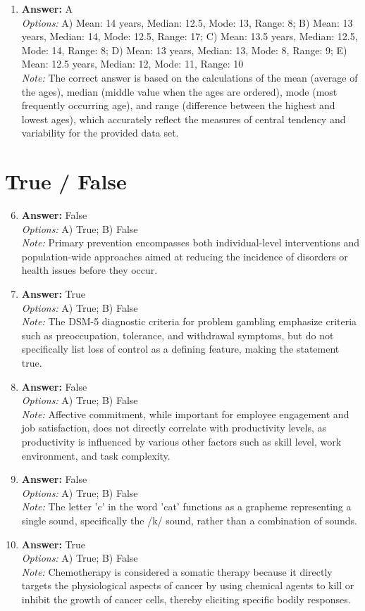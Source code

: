 \documentclass[12pt]{article}
\begin{document}
\begin{enumerate}[label=\arabic*.]
\item \textbf{Answer:} A
\\ \textit{Options:} A) Mean: 14 years, Median: 12.5, Mode: 13, Range: 8; B) Mean: 13 years, Median: 14, Mode: 12.5, Range: 17; C) Mean: 13.5 years, Median: 12.5, Mode: 14, Range: 8; D) Mean: 13 years, Median: 13, Mode: 8, Range: 9; E) Mean: 12.5 years, Median: 12, Mode: 11, Range: 10
\\ \textit{Note:} The correct answer is based on the calculations of the mean (average of the ages), median (middle value when the ages are ordered), mode (most frequently occurring age), and range (difference between the highest and lowest ages), which accurately reflect the measures of central tendency and variability for the provided data set.
\end{enumerate}

\section*{True / False}
\begin{enumerate}[label=\arabic*.]
\setcounter{enumi}{5}
\item \textbf{Answer:} False
\\ \textit{Options:} A) True; B) False
\\ \textit{Note:} Primary prevention encompasses both individual-level interventions and population-wide approaches aimed at reducing the incidence of disorders or health issues before they occur.
\item \textbf{Answer:} True
\\ \textit{Options:} A) True; B) False
\\ \textit{Note:} The DSM-5 diagnostic criteria for problem gambling emphasize criteria such as preoccupation, tolerance, and withdrawal symptoms, but do not specifically list loss of control as a defining feature, making the statement true.
\item \textbf{Answer:} False
\\ \textit{Options:} A) True; B) False
\\ \textit{Note:} Affective commitment, while important for employee engagement and job satisfaction, does not directly correlate with productivity levels, as productivity is influenced by various other factors such as skill level, work environment, and task complexity.
\item \textbf{Answer:} False
\\ \textit{Options:} A) True; B) False
\\ \textit{Note:} The letter 'c' in the word 'cat' functions as a grapheme representing a single sound, specifically the /k/ sound, rather than a combination of sounds.
\item \textbf{Answer:} True
\\ \textit{Options:} A) True; B) False
\\ \textit{Note:} Chemotherapy is considered a somatic therapy because it directly targets the physiological aspects of cancer by using chemical agents to kill or inhibit the growth of cancer cells, thereby eliciting specific bodily responses.
\end{enumerate}
\end{document}
